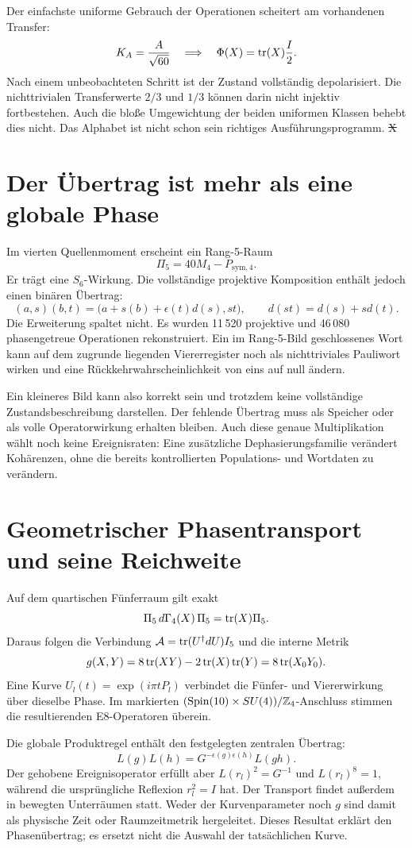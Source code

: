 Der einfachste uniforme Gebrauch der Operationen scheitert am vorhandenen Transfer:
\[
 K_A=\frac A{\sqrt{60}}\quad\Longrightarrow\quad
 \Phi(X)=\operatorname{tr}(X)\frac I2.
\]
Nach einem unbeobachteten Schritt ist der Zustand vollständig depolarisiert. Die nichttrivialen Transferwerte $2/3$ und $1/3$ können darin nicht injektiv fortbestehen. Auch die bloße Umgewichtung der beiden uniformen Klassen behebt dies nicht. Das Alphabet ist nicht schon sein richtiges Ausführungsprogramm. \st{X} 

\section{Der Übertrag ist mehr als eine globale Phase}
Im vierten Quellenmoment erscheint ein Rang-5-Raum
\[
 \Pi_5=40M_4-P_{\mathrm{sym},4}.
\]
Er trägt eine $S_6$-Wirkung. Die vollständige projektive Komposition enthält jedoch einen binären Übertrag:
\[
 (a,s)(b,t)=\bigl(a+s(b)+\epsilon(t)d(s),st\bigr),
 \qquad d(st)=d(s)+sd(t).
\]
Die Erweiterung spaltet nicht. Es wurden 11\,520 projektive und 46\,080 phasengetreue Operationen rekonstruiert. Ein im Rang-5-Bild geschlossenes Wort kann auf dem zugrunde liegenden Viererregister noch als nichttriviales Pauliwort wirken und eine Rückkehrwahrscheinlichkeit von eins auf null ändern. 

Ein kleineres Bild kann also korrekt sein und trotzdem keine vollständige Zustandsbeschreibung darstellen. Der fehlende Übertrag muss als Speicher oder als volle Operatorwirkung erhalten bleiben. Auch diese genaue Multiplikation wählt noch keine Ereignisraten: Eine zusätzliche Dephasierungsfamilie verändert Kohärenzen, ohne die bereits kontrollierten Populations- und Wortdaten zu verändern.

\section{Geometrischer Phasentransport und seine Reichweite}
Auf dem quartischen Fünferraum gilt exakt
\[
 \Pi_5\,d\Gamma_4(X)\,\Pi_5=\operatorname{tr}(X)\Pi_5.
\]
Daraus folgen die Verbindung $\mathcal A=\operatorname{tr}(U^\dagger dU)I_5$ und die interne Metrik
\[
 g(X,Y)=8\operatorname{tr}(XY)-2\operatorname{tr}(X)\operatorname{tr}(Y)=8\operatorname{tr}(X_0Y_0).
\]
Eine Kurve $U_l(t)=\exp(i\pi tP_l)$ verbindet die Fünfer- und Viererwirkung über dieselbe Phase. Im markierten $(\mathrm{Spin}(10)\times SU(4))/\mathbb Z_4$-Anschluss stimmen die resultierenden E8-Operatoren überein. 

Die globale Produktregel enthält den festgelegten zentralen Übertrag:
\[
 L(g)L(h)=G^{-\epsilon(g)\epsilon(h)}L(gh).
\]
Der gehobene Ereignisoperator erfüllt aber $L(r_l)^2=G^{-1}$ und $L(r_l)^8=1$, während die ursprüngliche Reflexion $r_l^2=I$ hat. Der Transport findet außerdem in bewegten Unterräumen statt. Weder der Kurvenparameter noch $g$ sind damit als physische Zeit oder Raumzeitmetrik hergeleitet. Dieses Resultat erklärt den Phasenübertrag; es ersetzt nicht die Auswahl der tatsächlichen Kurve.

